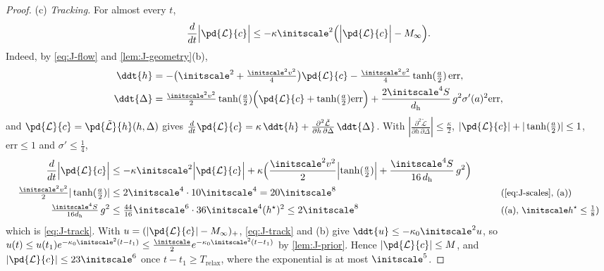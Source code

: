 \begin{proof}
\noindent(c) \emph{Tracking.} For almost every $t$,
\begin{equation}
 \frac{d}{dt}\Bigl|\pd{\mathcal L}{c}\Bigr|\le-\kappa\initscale^2\Bigl(\Bigl|\pd{\mathcal L}{c}\Bigr|-M_\infty\Bigr).
 \label{eq:J-track}
\end{equation}
Indeed, by \cref{eq:J-flow} and \cref{lem:J-geometry}(b),
\begin{align*}
 \ddt{h}&=-\bigl(\initscale^2+\tfrac{\initscale^2v^2}{4}\bigr) \pd{\mathcal L}{c}-\tfrac{\initscale^2v^2}{4}\tanh(\tfrac{a}{2})\,\mathrm{err},\\
 \ddt{\Delta}&=\tfrac{\initscale^2v^2}{2}\tanh(\tfrac{a}{2})\Bigl( \pd{\mathcal L}{c}+\tanh(\tfrac{a}{2})\mathrm{err}\Bigr)+\frac{2\initscale^4S}{d_{\mathrm h}}\,g^2\sigma'(a)^2\mathrm{err},
\end{align*}
and $\pd{\mathcal L}{c}=\pd{\tilde{\mathcal L}}{h}(h,\Delta)$ gives $\frac{d}{dt}\pd{\mathcal L}{c}=\kappa\,\ddt{h}+\frac{\partial^2\tilde{\mathcal L}}{\partial h\,\partial\Delta}\,\ddt{\Delta}$. With
$|\frac{\partial^2\tilde{\mathcal L}}{\partial h\,\partial\Delta}|\le\frac{\kappa}{2}$, $|\pd{\mathcal L}{c}|+|\tanh(\frac{a}{2})|\le1$, $\mathrm{err}\le1$ and $\sigma'\le\frac{1}{4}$,
\begin{alignat*}{2}
 \frac{d}{dt}\Bigl|\pd{\mathcal L}{c}\Bigr|&\le-\kappa\initscale^2\Bigl|\pd{\mathcal L}{c}\Bigr|+\kappa\Bigl(\frac{\initscale^2v^2}{2}\Bigl|\tanh(\tfrac{a}{2})\Bigr|+\frac{\initscale^4S}{16\,d_{\mathrm h}}\,g^2\Bigr) &\qquad& \\
 \tfrac{\initscale^2v^2}{2}|\tanh(\tfrac{a}{2})|&\le2\initscale^4\cdot10\initscale^4=20\initscale^8 && \why{\cref{eq:J-scales}, (a)}\\
 \tfrac{\initscale^4S}{16d_{\mathrm h}}\,g^2&\le\tfrac{44}{16}\initscale^6\cdot36\initscale^4(h^\star)^2\le2\initscale^8 && \why{(a), $\initscale h^\star\le\tfrac{1}{8}$}
\end{alignat*}
which is \cref{eq:J-track}. With $u=(|\pd{\mathcal L}{c}|-M_\infty)_+$, \cref{eq:J-track} and (b) give $\ddt{u}\le-\kappa_0\initscale^2u$, so
$u(t)\le u(t_1)e^{-\kappa_0\initscale^2(t-t_1)}\le\frac{\initscale}{2}e^{-\kappa_0\initscale^2(t-t_1)}$ by \cref{lem:J-prior}. Hence $|\pd{\mathcal L}{c}|\le M$, and
$|\pd{\mathcal L}{c}|\le23\initscale^6$ once $t-t_1\ge T_{\mathrm{relax}}$, where the exponential is at most $\initscale^5$.


\end{proof}
